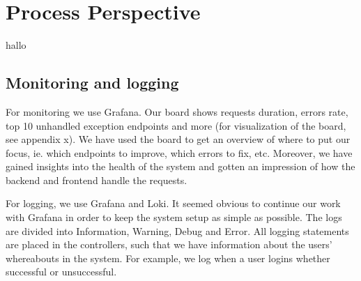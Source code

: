 \section{Process Perspective}
hallo \cite{devopshandbook}
\subsection{Monitoring and logging}
For monitoring we use Grafana. Our board shows requests duration, errors rate, top 10 unhandled exception endpoints and more (for visualization of the board, see appendix x). We have used the board to get an overview of where to put our focus, ie. which endpoints to improve, which errors to fix, etc. Moreover, we have gained insights into the health of the system and gotten an impression of how the backend and frontend handle the requests.

For logging, we use Grafana and Loki. It seemed obvious to continue our work with Grafana in order to keep the system setup as simple as possible. The logs are divided into Information, Warning, Debug and Error. All logging statements are placed in the controllers, such that we have information about the users' whereabouts in the system. For example, we log when a user logins whether successful or unsuccessful.
